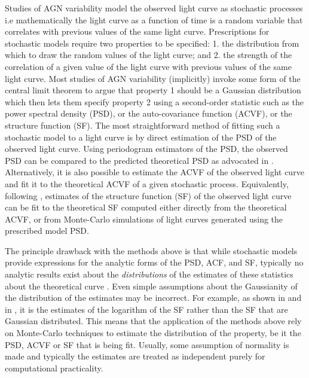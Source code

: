 \documentclass[a4paper,fleqn,usenatbib]{mnras}
\begin{document}
Studies of AGN variability model the observed light curve as stochastic processes i.e mathematically the light curve as a function of time is a random variable that correlates with previous values of the same light curve. Prescriptions for stochastic models require two properties to be specified: 1. the distribution from which to draw the random values of the light curve; and 2. the strength of the correlation of a given value of the light curve with previous values of the same light curve. Most studies of AGN variability (implicitly) invoke some form of the central limit theorem to argue that property 1 should be a Gaussian distribution which then lets them specify property 2 using a second-order statistic such as the power spectral density (PSD), or the auto-covariance function (ACVF), or the structure function (SF). The most straightforward method of fitting such a stochastic model to a light curve is by direct estimation of the PSD of the observed light curve. Using periodogram estimators of the PSD, the observed PSD can be compared to the predicted theoretical PSD as advocated in \citet*{Uttley02}. Alternatively, it is also possible to estimate the ACVF of the observed light curve and fit it to the theoretical ACVF of a given stochastic process. Equivalently, following \citet*{Kasliwal15}, estimates of the structure function (SF) of the observed light curve can be fit to the theoretical SF computed either directly from the theoretical ACVF, or from Monte-Carlo simulations of light curves generated using the prescribed model PSD.

The principle drawback with the methods above is that while stochastic models provide expressions for the analytic forms of the PSD, ACF, and SF, typically no analytic results exist about the \textit{distributions} of the estimates of these statistics about the theoretical curve \citep{BrockwellDavisITSF}. Even simple assumptions about the Gaussianity of the distribution of the estimates may be incorrect. For example, as shown in \citet*{Emm10} and in \citet{Kasliwal15}, it is the estimates of the logarithm of the SF rather than the SF that are Gaussian distributed. This means that the application of the methods above rely on Monte-Carlo techniques to estimate the distribution of the property, be it the PSD, ACVF or SF that is being fit. Usually, some assumption of normality is made and typically the estimates are treated as independent purely for computational practicality. 
\end{document}
